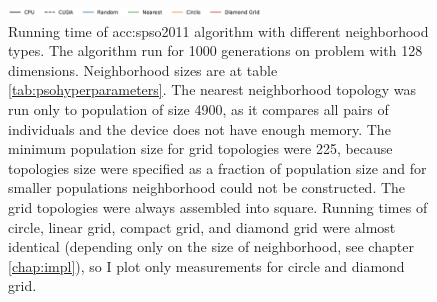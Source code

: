 \begin{figure}[ht!]
    \begin{minipage}{\textwidth}
        \centering
        \includegraphics[width=0.6\textwidth]{img/runs/time_pso_neigh_legend.pdf}
    \end{minipage}

    \caption[PSO2006 neighborhood running time]{Running time of \acrlong{acc:spso2011} algorithm with different neighborhood types. The algorithm run for 1000 generations on problem with 128 dimensions. Neighborhood sizes are at table \ref{tab:psohyperparameters}. The nearest neighborhood topology was run only to population of size 4900, as it compares all pairs of individuals and the device does not have enough memory. The minimum population size for grid topologies were 225, because topologies size were specified as a fraction of population size and for smaller populations neighborhood could not be constructed. The grid topologies were always assembled into square. Running times of circle, linear grid, compact grid, and diamond grid were almost identical (depending only on the size of neighborhood, see chapter \ref{chap:impl}), so I plot only measurements for circle and diamond grid.}
\end{figure}



